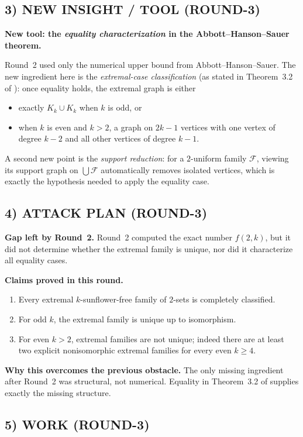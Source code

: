 \subsection{3) NEW INSIGHT / TOOL (ROUND-3)}
\textbf{New tool: the \emph{equality characterization} in the Abbott--Hanson--Sauer theorem.}

Round~2 used only the numerical upper bound from Abbott--Hanson--Sauer. The new ingredient here is the \emph{extremal-case classification} (as stated in Theorem~3.2 of \cite{KupavskiiNoskov2025}): once equality holds, the extremal graph is either
\begin{itemize}
\item exactly $K_k\cup K_k$ when $k$ is odd, or
\item when $k$ is even and $k>2$, a graph on $2k-1$ vertices with one vertex of degree $k-2$ and all other vertices of degree $k-1$.
\end{itemize}
A second new point is the \emph{support reduction}: for a $2$-uniform family $\mathcal F$, viewing its support graph on $\bigcup\mathcal F$ automatically removes isolated vertices, which is exactly the hypothesis needed to apply the equality case.

\subsection{4) ATTACK PLAN (ROUND-3)}
\textbf{Gap left by Round~2.}
Round~2 computed the exact number $f(2,k)$, but it did not determine whether the extremal family is unique, nor did it characterize all equality cases.

\textbf{Claims proved in this round.}
\begin{enumerate}
\item Every extremal $k$-sunflower-free family of $2$-sets is completely classified.
\item For odd $k$, the extremal family is unique up to isomorphism.
\item For even $k>2$, extremal families are not unique; indeed there are at least two explicit nonisomorphic extremal families for every even $k\ge 4$.
\end{enumerate}

\textbf{Why this overcomes the previous obstacle.}
The only missing ingredient after Round~2 was structural, not numerical. Equality in Theorem~3.2 of \cite{KupavskiiNoskov2025} supplies exactly the missing structure.

\subsection{5) WORK (ROUND-3)}

